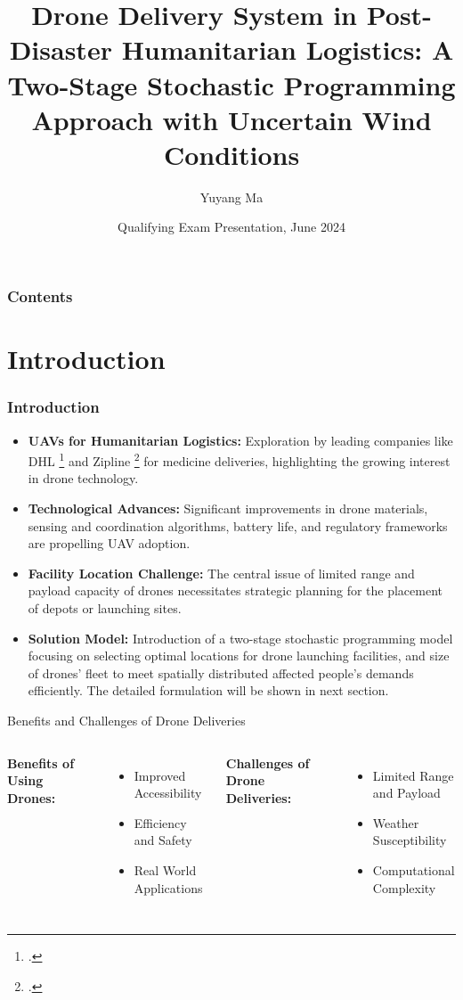 \documentclass[aspectratio=169]{beamer}
\title[Facility Location w. Drones] %
{Drone Delivery System in Post-Disaster Humanitarian Logistics: A
Two-Stage Stochastic Programming Approach with Uncertain Wind
Conditions}
\author[Yuyang Ma] %
{Yuyang Ma}
\institute[ISE] %
{
  Department of Industrial and Systems Engineering\\
  Lehigh University
}
\date[Jun 13 2024] %
{Qualifying Exam Presentation, June 2024}
\begin{document}
\newcommand{\hltblue}[1]{\textcolor{blue}{#1}}
\newcommand{\hltred}[1]{\textcolor{red}{#1}}

\frame{\titlepage}
\begin{frame}
\frametitle{Contents}
\tableofcontents
\end{frame}
\section{Introduction}
\begin{frame}
    \frametitle{Introduction}
    \begin{itemize}
      \item \textbf{UAVs for Humanitarian Logistics:} Exploration by leading companies like DHL \footcite{dhl2018drone} and Zipline \footcite{Zipline2020} for medicine deliveries, highlighting the growing interest in drone technology.
      \item \textbf{Technological Advances:} Significant improvements in drone materials, sensing and coordination algorithms, battery life, and regulatory frameworks are propelling UAV adoption.
      \item \textbf{Facility Location Challenge:} The central issue of limited range and payload capacity of drones necessitates strategic planning for the placement of depots or launching sites.
      \item \textbf{Solution Model:} Introduction of a two-stage stochastic programming model focusing on selecting optimal locations for drone launching facilities, and size of drones' fleet to meet spatially distributed affected people's demands efficiently. The detailed formulation will be shown in next section.
    \end{itemize}
\end{frame}

\begin{frame}{Benefits and Challenges of Drone Deliveries}
  \begin{columns}
    \textbf{Benefits of Using Drones:}
    \begin{itemize}
      \item Improved Accessibility
      \item Efficiency and Safety
      \item Real World Applications
    \end{itemize}
    
    \textbf{Challenges of Drone Deliveries:}
    \begin{itemize}
      \item Limited Range and Payload
      \item Weather Susceptibility
      \item Computational Complexity
    \end{itemize}
  \end{columns}
\end{frame}
\end{document}
